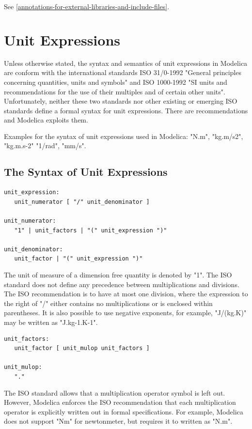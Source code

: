 \documentclass[10pt,a4paper]{report}
\def\doublelabel#1{\label{#1}\hypertarget{#1}{}}
\begin{document}
See \ref{annotations-for-external-libraries-and-include-files}.

\chapter{Unit Expressions}\doublelabel{unit-expressions}

Unless otherwise stated, the syntax and semantics of unit expressions in
Modelica are conform with the international standards ISO 31/0-1992
"General principles concerning quantities, units and symbols" and ISO
1000-1992 "SI units and recommendations for the use of their multiples
and of certain other units". Unfortunately, neither these two standards
nor other existing or emerging ISO standards define a formal syntax for
unit expressions. There are recommendations and Modelica exploits them.

Examples for the syntax of unit expressions used in Modelica: "N.m",
"kg.m/s2", "kg.m.s-2" "1/rad", "mm/s".

\section{The Syntax of Unit Expressions}\doublelabel{the-syntax-of-unit-expressions}
\begin{lstlisting}[language=grammar]
unit_expression:
   unit_numerator [ "/" unit_denominator ]
   
unit_numerator:
   "1" | unit_factors | "(" unit_expression ")"
   
unit_denominator:
   unit_factor | "(" unit_expression ")"
\end{lstlisting}

The unit of measure of a dimension free quantity is denoted by "1". The
ISO standard does not define any precedence between multiplications and
divisions. The ISO recommendation is to have at most one division, where
the expression to the right of "/" either contains no multiplications or
is enclosed within parentheses. It is also possible to use negative
exponents, for example, "J/(kg.K)" may be written as "J.kg-1.K-1".

\begin{lstlisting}[language=grammar]
unit_factors:
   unit_factor [ unit_mulop unit_factors ]

unit_mulop:
   "."
\end{lstlisting}

The ISO standard allows that a multiplication operator symbol is left
out. However, Modelica enforces the ISO recommendation that each
multiplication operator is explicitly written out in formal
specifications. For example, Modelica does not support "Nm" for
newtonmeter, but requires it to written as "N.m".
\end{document}
